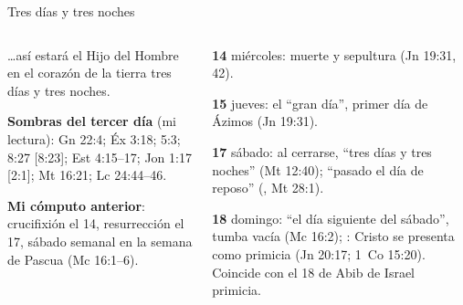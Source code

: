 \begin{frame}{Tres días y tres noches}
\begin{columns}[t,onlytextwidth]
\begin{column}{0.50\textwidth}
\begin{cita}\ldots{}así estará el Hijo del Hombre en el corazón de la tierra tres días y tres noches.\end{cita}
\scriptsize\RaggedRight \textbf{Sombras del tercer día} (mi lectura): Gn 22:4; Éx 3:18; 5:3; 8:27 [8:23]; Est 4:15--17; Jon 1:17 [2:1]; Mt 16:21; Lc 24:44--46.\par\smallskip
\textbf{Mi cómputo anterior}: crucifixión el 14, resurrección el 17, sábado semanal en la semana de Pascua (Mc 16:1--6).\par\smallskip
{}
\end{column}
\begin{column}{0.48\textwidth}\scriptsize\RaggedRight
\begin{tcolorbox}[colback=papiro,colframe=tierraroja,boxrule=1pt,arc=3pt,title={\scriptsize\bfseries Lectura de la serie},coltitle=papiro,colbacktitle=tierraroja,fontupper=\scriptsize,left=3pt,right=3pt,top=2pt,bottom=2pt]
\RaggedRight
\textbf{14} miércoles: muerte y sepultura (Jn 19:31, 42).\par
\textbf{15} jueves: el ``gran día'', primer día de Ázimos (Jn 19:31).\par
\textbf{17} sábado: al cerrarse, ``tres días y tres noches'' (Mt 12:40); ``pasado el día de reposo'' (, Mt 28:1).\par
\textbf{18} domingo: ``el día siguiente del sábado'', tumba vacía (Mc 16:2); : Cristo se presenta como primicia (Jn 20:17; 1~Co 15:20). Coincide con el 18 de Abib de Israel primicia.
\end{tcolorbox}
\end{column}
\end{columns}
\end{frame}

